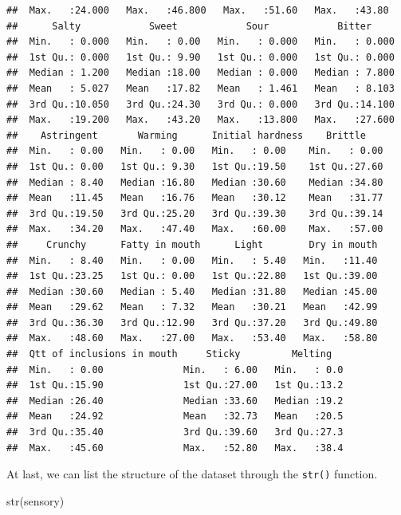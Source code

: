 \documentclass[
]{book}
\newenvironment{Shaded}{\begin{snugshade}}{\end{snugshade}}
\newcommand{\FunctionTok}[1]{\textcolor[rgb]{0.00,0.00,0.00}{#1}}
\newcommand{\NormalTok}[1]{#1}
\begin{document}
\begin{verbatim}
##  Max.   :24.000   Max.   :46.800   Max.   :51.60   Max.   :43.80             
##      Salty            Sweet            Sour            Bitter      
##  Min.   : 0.000   Min.   : 0.00   Min.   : 0.000   Min.   : 0.000  
##  1st Qu.: 0.000   1st Qu.: 9.90   1st Qu.: 0.000   1st Qu.: 0.000  
##  Median : 1.200   Median :18.00   Median : 0.000   Median : 7.800  
##  Mean   : 5.027   Mean   :17.82   Mean   : 1.461   Mean   : 8.103  
##  3rd Qu.:10.050   3rd Qu.:24.30   3rd Qu.: 0.000   3rd Qu.:14.100  
##  Max.   :19.200   Max.   :43.20   Max.   :13.800   Max.   :27.600  
##    Astringent       Warming      Initial hardness    Brittle     
##  Min.   : 0.00   Min.   : 0.00   Min.   : 0.00    Min.   : 0.00  
##  1st Qu.: 0.00   1st Qu.: 9.30   1st Qu.:19.50    1st Qu.:27.60  
##  Median : 8.40   Median :16.80   Median :30.60    Median :34.80  
##  Mean   :11.45   Mean   :16.76   Mean   :30.12    Mean   :31.77  
##  3rd Qu.:19.50   3rd Qu.:25.20   3rd Qu.:39.30    3rd Qu.:39.14  
##  Max.   :34.20   Max.   :47.40   Max.   :60.00    Max.   :57.00  
##     Crunchy      Fatty in mouth      Light        Dry in mouth  
##  Min.   : 8.40   Min.   : 0.00   Min.   : 5.40   Min.   :11.40  
##  1st Qu.:23.25   1st Qu.: 0.00   1st Qu.:22.80   1st Qu.:39.00  
##  Median :30.60   Median : 5.40   Median :31.80   Median :45.00  
##  Mean   :29.62   Mean   : 7.32   Mean   :30.21   Mean   :42.99  
##  3rd Qu.:36.30   3rd Qu.:12.90   3rd Qu.:37.20   3rd Qu.:49.80  
##  Max.   :48.60   Max.   :27.00   Max.   :53.40   Max.   :58.80  
##  Qtt of inclusions in mouth     Sticky         Melting    
##  Min.   : 0.00              Min.   : 6.00   Min.   : 0.0  
##  1st Qu.:15.90              1st Qu.:27.00   1st Qu.:13.2  
##  Median :26.40              Median :33.60   Median :19.2  
##  Mean   :24.92              Mean   :32.73   Mean   :20.5  
##  3rd Qu.:35.40              3rd Qu.:39.60   3rd Qu.:27.3  
##  Max.   :45.60              Max.   :52.80   Max.   :38.4
\end{verbatim}

At last, we can list the structure of the dataset through the \texttt{str()} function.

\begin{Shaded}
\begin{Highlighting}[]
\FunctionTok{str}\NormalTok{(sensory)}
\end{Highlighting}
\end{Shaded}
\end{document}

